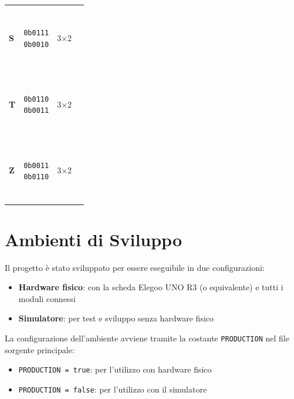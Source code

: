 \documentclass[a4paper, 12pt]{article}
\newcommand{\RedBlock}{\colorbox{red}{\rule{1.2ex}{1.2ex}}}      %
\newcommand{\WhiteBlock}{\fcolorbox{black}{white}{\rule{1.2ex}{1.2ex}}} %
\begin{document}
\begin{table}[H]
\begin{tabular}{
            >{\bfseries}l   %
            c               %
            c               %
            l               %
        }
        \addlinespace
        S     & \makecell{\texttt{0b0111}                                                                                                  \\\texttt{0b0010}}
              & 3\(\times\)2
              & \makecell{\WhiteBlock\RedBlock\RedBlock\RedBlock                                                                           \\\WhiteBlock\WhiteBlock\RedBlock\WhiteBlock} \\
        \addlinespace
        T     & \makecell{\texttt{0b0110}                                                                                                  \\\texttt{0b0011}}
              & 3\(\times\)2
              & \makecell{\WhiteBlock\RedBlock\RedBlock\WhiteBlock                                                                         \\\RedBlock\RedBlock\WhiteBlock\WhiteBlock} \\
        \addlinespace
        Z     & \makecell{\texttt{0b0011}                                                                                                  \\\texttt{0b0110}}
              & 3\(\times\)2
              & \makecell{\RedBlock\RedBlock\WhiteBlock\WhiteBlock                                                                         \\\WhiteBlock\RedBlock\RedBlock\WhiteBlock} \\
        \bottomrule
    \end{tabular}
\end{table}

\section{Ambienti di Sviluppo}
\label{sec:ambienti}
Il progetto è stato sviluppato per essere eseguibile in due configurazioni:
\begin{itemize}
    \item \textbf{Hardware fisico}: con la scheda Elegoo UNO R3 (o equivalente) e tutti i moduli connessi
    \item \textbf{Simulatore}: per test e sviluppo senza hardware fisico
\end{itemize}

La configurazione dell'ambiente avviene tramite la costante \texttt{PRODUCTION} nel file sorgente principale:
\begin{itemize}
    \item \texttt{PRODUCTION = true}: per l'utilizzo con hardware fisico
    \item \texttt{PRODUCTION = false}: per l'utilizzo con il simulatore
\end{itemize}
\end{document}
